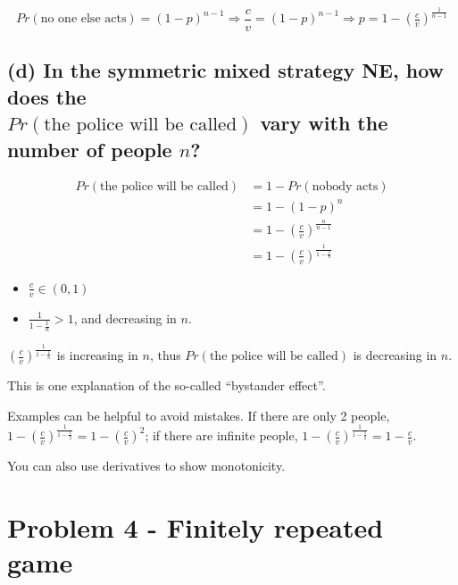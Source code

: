 \documentclass{article}
\begin{document}
$$Pr(\text{no one else acts}) = (1-p)^{n-1} \Rightarrow \frac{c}{v}= (1-p)^{n-1} \Rightarrow  p = 1 - \left( \tfrac{c}{v} \right)^\frac1{n-1}$$ 


\subsection*{(d) In the symmetric mixed strategy NE, how does the \\ $Pr(\text{the police  will  be  called})$ vary with the number of people $n$?}  

\begin{align*}
Pr(\text{the police  will  be  called}) &= 1 - Pr(\text{nobody acts})  \\
&= 1- (1-p)^n \\
&= 1- \left( \tfrac{c}{v} \right)^\frac n{n-1} \\
&= 1- \left( \tfrac{c}{v} \right)^\frac 1{1-\tfrac 1n}
\end{align*}

\begin{itemize}
\item $\tfrac{c}{v} \in (0,1)$
\item $\frac 1{1-\tfrac 1n} > 1$, and decreasing in $n$.
\end{itemize}

$\left( \tfrac{c}{v} \right)^\frac 1{1-\tfrac 1n}$ is increasing in $n$, thus $Pr(\text{the police  will be called})$ is decreasing in $n$.

\begin{mdframed}[backgroundcolor=blue!20,linecolor=white]
This is one explanation of the so-called ``bystander effect''.
\end{mdframed}

\begin{mdframed}[backgroundcolor=yellow!20,linecolor=white]

Examples can be helpful to avoid mistakes. If there are only 2 people, $1-\left( \tfrac{c}{v} \right)^\frac 1{1-\tfrac 1 2} =1- \left( \tfrac{c}{v} \right)^2$; if there are infinite people,  $1- \left( \tfrac{c}{v} \right)^\frac 1{1-\tfrac 1 2} =1- \tfrac{c}{v}$.

\smallskip
You can also use derivatives to show monotonicity.
\end{mdframed}




\section{Problem 4 - Finitely repeated game}
\end{document}
